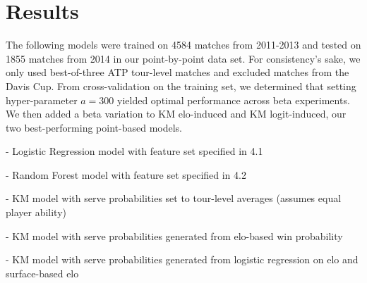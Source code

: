 \documentclass[chapterprefix=false]{report}
\begin{document}







\section{Results}

The following models were trained on 4584 matches from 2011-2013 and tested on 1855 matches from 2014 in our point-by-point data set. For consistency's sake, we only used best-of-three ATP tour-level matches and excluded matches from the Davis Cup. From cross-validation on the training set, we determined that setting hyper-parameter $a=300$ yielded optimal performance across beta experiments. We then added a beta variation to KM elo-induced and KM logit-induced, our two best-performing point-based models.

\begin{description}[leftmargin=2.5cm, labelindent=2.5cm]
\item[LR] - Logistic Regression model with feature set specified in 4.1

\item[Random Forest] - Random Forest model with feature set specified in 4.2

\item[Equivalent] - KM model with serve probabilities set to tour-level averages (assumes equal player ability)

\item[elo-induced] - KM model with serve probabilities generated from elo-based win probability

\item[logit-induced] - KM model with serve probabilities generated from logistic regression on elo and surface-based elo
\end{description}
\end{document}

